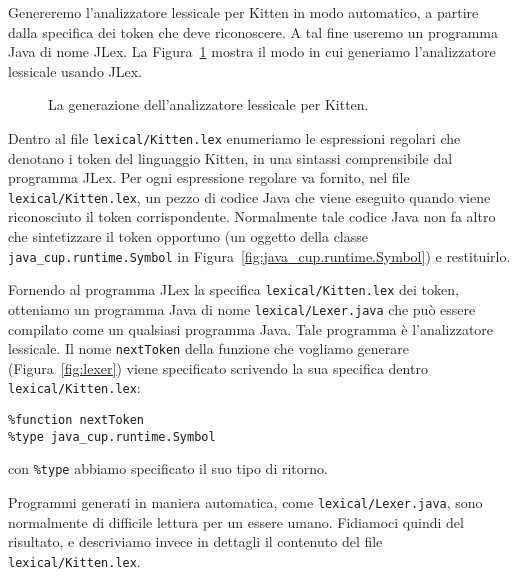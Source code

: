 Genereremo l'analizzatore lessicale per Kitten in modo automatico, a partire
dalla specifica dei token che deve riconoscere. A tal fine useremo un
programma Java di nome JLex. La Figura~\ref{fig:jlex} mostra il
modo in cui generiamo l'analizzatore lessicale usando JLex.
%
\begin{figure}
\begin{center}
\end{center}
\caption{La generazione dell'analizzatore lessicale per Kitten.}
  \label{fig:jlex}
\end{figure}
%
Dentro al file \texttt{lexical/Kitten.lex} enumeriamo
le espressioni regolari che denotano i token del linguaggio
Kitten, in una sintassi comprensibile dal programma JLex.
Per ogni espressione regolare va fornito, nel file
\texttt{lexical/Kitten.lex}, un pezzo di codice
Java che viene eseguito quando viene riconosciuto il token corrispondente.
Normalmente tale codice Java non fa altro
che sintetizzare il token opportuno (\cioe un oggetto della classe
\texttt{java\_cup.runtime.Symbol} in Figura~\ref{fig:java_cup.runtime.Symbol})
e restituirlo.

Fornendo al programma JLex la specifica
\texttt{lexical/Kitten.lex} dei token, otteniamo un programma Java
di nome \texttt{lexical/Lexer.java} che pu\`o essere compilato
come un qualsiasi programma Java. Tale programma \`e l'analizzatore
lessicale. Il nome \texttt{nextToken} della funzione che vogliamo generare
(Figura~\ref{fig:lexer}) viene specificato scrivendo la sua specifica dentro
\texttt{lexical/Kitten.lex}:
%
\begin{verbatim}
%function nextToken
%type java_cup.runtime.Symbol
\end{verbatim}
%
con \texttt{\%type} abbiamo specificato il suo tipo di ritorno.

Programmi generati in maniera automatica, come \texttt{lexical/Lexer.java},
sono normalmente di difficile lettura per un essere umano.
Fidiamoci quindi del risultato, e descriviamo invece in \piu dettagli
il contenuto del file \texttt{lexical/Kitten.lex}.
%
